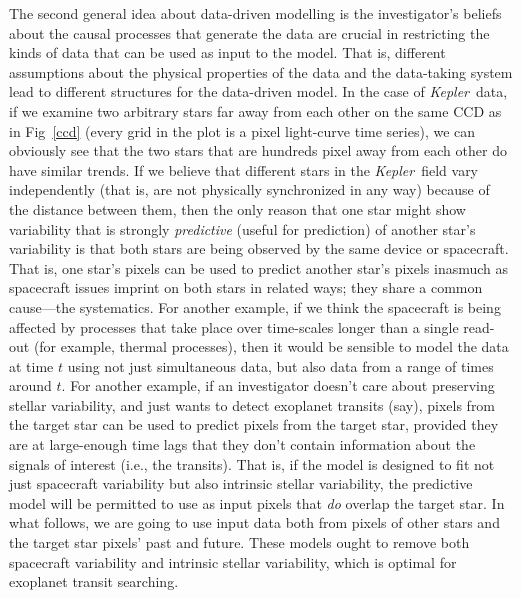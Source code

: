 \documentclass[12pt, preprint]{aastex}
\newcommand{\project}[1]{\textsl{#1}}
\newcommand{\Kepler}{\project{Kepler}}
\begin{document}
The second general idea about data-driven modelling is the investigator's beliefs
  about the causal processes that generate the data
  are crucial in restricting the kinds of data that can be used as input to the model.
That is, different assumptions about the physical properties of the data
  and the data-taking system
  lead to different structures for the data-driven model.
In the case of \Kepler\ data, 
  if we examine two arbitrary stars far away from each other 
  on the same CCD as in Fig~\ref{ccd} (every grid in the plot is a pixel light-curve time series), 
  we can obviously see that the two stars that are hundreds pixel away from each other do have similar trends. 
  If we believe that different stars in the \Kepler\ field vary independently 
  (that is, are not physically synchronized in any way) because of the distance between them, 
  then the only reason that one star might show variability that is strongly \emph{predictive} (useful for prediction) of another star's variability
  is that both stars are being observed by the same device or spacecraft.
That is, one star's pixels can be used to predict another star's pixels
  inasmuch as spacecraft issues imprint on both stars in related ways;
  they share a common cause---the systematics.  
For another example, if we think the spacecraft is being affected by
  processes that take place over time-scales longer than a single read-out
  (for example, thermal processes),
  then it would be sensible to model the data at time $t$ using not just simultaneous data, but also data from a range of times around $t$.
For another example, if an investigator doesn't care about preserving stellar variability,
  and just wants to detect exoplanet transits (say),
  pixels from the target star can be used to predict pixels from the target star,
  provided they are at large-enough time lags that they don't contain information about
  the signals of interest (i.e., the transits).
That is, if the model is designed to fit not just spacecraft variability
  but also intrinsic stellar variability,
  the predictive model will be permitted to use as input pixels that \emph{do} overlap the 
  target star.
In what follows, we are going to use input data both from pixels of other stars and the  
target star pixels' past and future.
These models ought to remove both spacecraft variability and intrinsic stellar variability, 
which is optimal for exoplanet transit searching.
\end{document}
